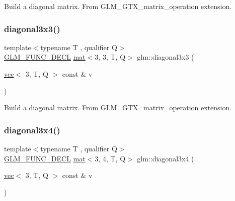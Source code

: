 Build a diagonal matrix. From G\+L\+M\+\_\+\+G\+T\+X\+\_\+matrix\+\_\+operation extension. \mbox{\label{group__gtx__matrix__operation_ga5487ff9cdbc8e04d594adef1bcb16ee0}} 
\subsubsection{\texorpdfstring{diagonal3x3()}{diagonal3x3()}}
{\footnotesize\ttfamily template$<$typename T , qualifier Q$>$ \\
\hyperlink{setup_8hpp_ab2d052de21a70539923e9bcbf6e83a51}{G\+L\+M\+\_\+\+F\+U\+N\+C\+\_\+\+D\+E\+CL} \hyperlink{structglm_1_1mat}{mat}$<$3, 3, T, Q$>$ glm\+::diagonal3x3 (\begin{DoxyParamCaption}\item[{\hyperlink{structglm_1_1vec}{vec}$<$ 3, T, Q $>$ const \&}]{v }\end{DoxyParamCaption})}

Build a diagonal matrix. From G\+L\+M\+\_\+\+G\+T\+X\+\_\+matrix\+\_\+operation extension. \mbox{\label{group__gtx__matrix__operation_gad7551139cff0c4208d27f0ad3437833e}} 
\subsubsection{\texorpdfstring{diagonal3x4()}{diagonal3x4()}}
{\footnotesize\ttfamily template$<$typename T , qualifier Q$>$ \\
\hyperlink{setup_8hpp_ab2d052de21a70539923e9bcbf6e83a51}{G\+L\+M\+\_\+\+F\+U\+N\+C\+\_\+\+D\+E\+CL} \hyperlink{structglm_1_1mat}{mat}$<$3, 4, T, Q$>$ glm\+::diagonal3x4 (\begin{DoxyParamCaption}\item[{\hyperlink{structglm_1_1vec}{vec}$<$ 3, T, Q $>$ const \&}]{v }\end{DoxyParamCaption})}

